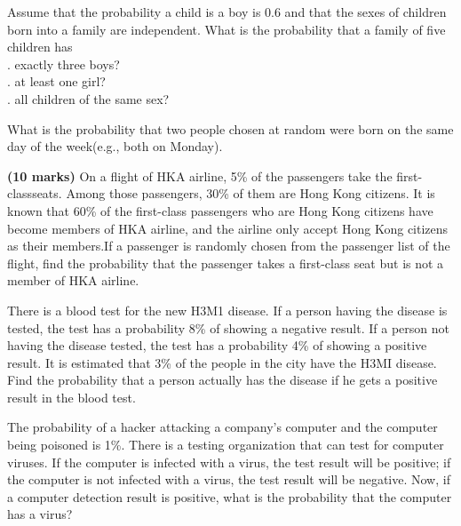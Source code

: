 \documentclass{article}
\begin{document}
\vspace{3\baselineskip}

\noindent Assume that the probability a child is a boy is 0.6 and that the sexes of children born into a family are independent. What is the probability that a family of five children has \\
. exactly three boys? \\
. at least one girl? \\
. all children of the same sex? \\

\vspace{3\baselineskip}

\noindent What is the probability that two people chosen at random were born on the same day of the week(e.g., both on Monday).\\

\vspace{3\baselineskip}

\noindent \textbf{(10 marks)} On a flight of HKA airline, 5\% of the passengers take the first-classseats. Among those passengers, 30\% of them are Hong Kong citizens. It is known that 60\% of the first-class passengers who are Hong Kong citizens have become members of HKA  airline, and the airline only accept Hong Kong citizens as their members.If a passenger is  randomly chosen from the passenger list of the flight, find the probability that the passenger takes a first-class seat but is not a member of HKA airline.\\

\vspace{3\baselineskip}

\noindent There is a blood test for the new H3M1 disease. If a person having the disease is tested, the test has a probability 8\% of showing a negative result. If a person not having the disease tested, the test has a probability 4\% of showing a positive result. It is estimated that 3\% of the people in the city have the H3MI disease. Find the probability that a person actually has the disease if he gets a positive result in the blood test.

\vspace{3\baselineskip}

\noindent The probability of a hacker attacking a company's computer and the computer being poisoned is 1\%. There is a testing organization that can test for computer viruses. If the computer is infected with a virus, the test result will be positive; if the computer is not infected with a virus, the test result will be negative. Now, if a computer detection result is positive, what is the probability that the computer has a virus?
\end{document}
